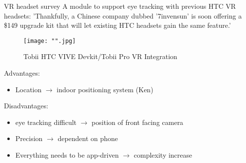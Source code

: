 \documentclass{beamer}
\begin{document}
\begin{frame}{VR headset survey}
	A module to support eye tracking with previous HTC VR headsets:
	'Thankfully, a Chinese company dubbed '7invensun' is soon offering a \$149 upgrade kit that will let existing HTC headsets gain the same feature.'
	\begin{figure}
		\texttt{[image: "".jpg]}
		\caption{Tobii HTC VIVE Devkit/Tobii Pro VR Integration}
	\end{figure}
	
	Advantages:
	\begin{itemize}
	
		\item Location $\rightarrow$ indoor positioning system (Ken)
	\end{itemize}
	
	Disadvantages:
	\begin{itemize}
		\item eye tracking difficult $\rightarrow$ position of front facing camera
		\item Precision $\rightarrow$ dependent on phone
		\item Everything needs to be app-driven $\rightarrow$ complexity increase
	\end{itemize}
\end{frame}
\end{document}
